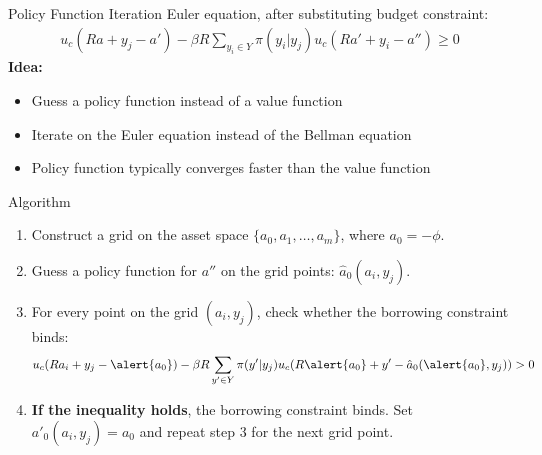 \documentclass{beamer}
\begin{document}
\begin{frame}{Policy Function Iteration}
Euler equation, after substituting budget constraint:
\begin{align*}
u_c(Ra + y_j - a') - \beta R \displaystyle \sum_{y_i \in Y} \pi(y_i|y_j) u_c(Ra' + y_i - a'') \geq 0
\end{align*} 
\textbf{Idea:}
\begin{itemize}
\item Guess a policy function instead of a value function 
\item Iterate on the Euler equation instead of the Bellman equation
\item Policy function typically converges faster than the value function
\end{itemize}
\end{frame}

\newcommand*{\saveenum}{\setcounter{savedenum}{\theenumi}}
\newcommand*{\resume}{\setcounter{enumi}{\thesavedenum}}
\begin{frame}{Algorithm}
\begin{enumerate}
\item Construct a grid on the asset space $\{a_0, a_1, \hdots, a_m \}$, where $a_0 = -\phi$. 
\item Guess a policy function for $a''$ on the grid points: $\hat{a}_0(a_i, y_j)$.
\item For every point on the grid $(a_i, y_j)$, check whether the borrowing constraint binds:
\begin{align*}
u_c(Ra_i + y_j - \alert{a_0}) - \beta R \displaystyle \sum_{y' \in Y} \pi(y'|y_j) u_c(R\alert{a_0} + y' - \hat{a}_0(\alert{a_0}, y_j)) > 0
\end{align*} 
\item \textbf{If the inequality holds}, the borrowing constraint binds. Set $a'_0(a_i, y_j) = a_0$ and repeat step 3 for the next grid point.
\saveenum
\end{enumerate}
\end{frame}
\end{document}
